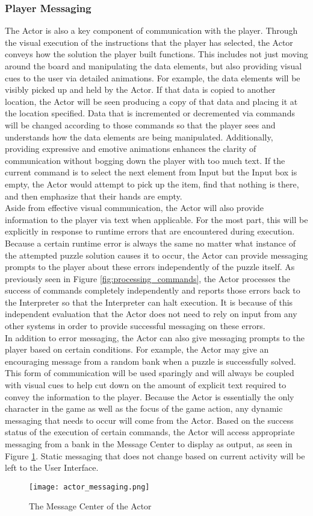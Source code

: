 \subsubsection{Player Messaging}
The Actor is also a key component of communication with the player. Through the visual execution of the instructions that the player has selected, the Actor conveys how the solution the player built functions. This includes not just moving around the board and manipulating the data elements, but also providing visual cues to the user via detailed animations. For example, the data elements will be visibly picked up and held by the Actor. If that data is copied to another location, the Actor will be seen producing a copy of that data and placing it at the location specified. Data that is incremented or decremented via commands will be changed according to those commands so that the player sees and understands how the data elements are being manipulated. Additionally, providing expressive and emotive animations enhances the clarity of communication without bogging down the player with too much text. If the current command is to select the next element from Input but the Input box is empty, the Actor would attempt to pick up the item, find that nothing is there, and then emphasize that their hands are empty.\\

Aside from effective visual communication, the Actor will also provide information to the player via text when applicable. For the most part, this will be explicitly in response to runtime errors that are encountered during execution. Because a certain runtime error is always the same no matter what instance of the attempted puzzle solution causes it to occur, the Actor can provide messaging prompts to the player about these errors independently of the puzzle itself. As previously seen in Figure \ref{fig:processing_commands}, the Actor processes the success of commands completely independently and reports those errors back to the Interpreter so that the Interpreter can halt execution. It is because of this independent evaluation that the Actor does not need to rely on input from any other systems in order to provide successful messaging on these errors.\\

In addition to error messaging, the Actor can also give messaging prompts to the player based on certain conditions. For example, the Actor may give an encouraging message from a random bank when a puzzle is successfully solved. This form of communication will be used sparingly and will always be coupled with visual cues to help cut down on the amount of explicit text required to convey the information to the player. Because the Actor is essentially the only character in the game as well as the focus of the game action, any dynamic messaging that needs to occur will come from the Actor. Based on the success status of the execution of certain commands, the Actor will access appropriate messaging from a bank in the Message Center to display as output, as seen in Figure \ref{fig:actor_messaging}. Static messaging that does not change based on current activity will be left to the User Interface.\\

\begin{figure}[h]
  \caption{The Message Center of the Actor}
  \label{fig:actor_messaging}
  \centering
  \texttt{[image: actor\_messaging.png]}
\end{figure}